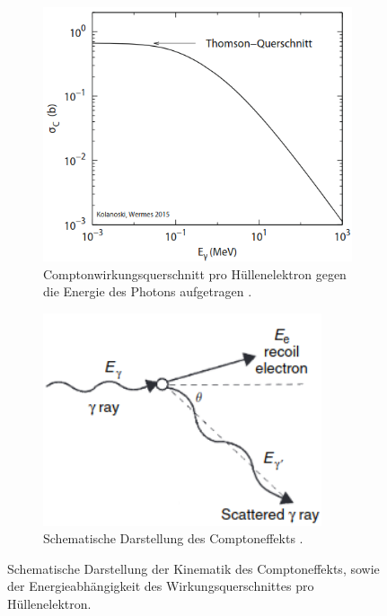 \begin{figure}
\centering
\begin{subfigure}{0.55\textwidth}
\centering
\includegraphics[width=1.03\textwidth]{compton2.png}
\captionsetup{format=hang, labelfont = bf, textfont = small}
\caption{Comptonwirkungsquerschnitt pro Hüllenelektron gegen die Energie des Photons aufgetragen \cite{quelle03}.}
\label{fig:tfig3}
\end{subfigure}
\begin{subfigure}{0.42\textwidth}
\vspace{35pt}
\centering
\includegraphics[width=0.9\textwidth]{Compton.png}
\vspace{39pt}
\captionsetup{format=hang, labelfont = bf, textfont = small}
\caption{Schematische Darstellung des Comptoneffekts \cite{quelle02}.}
\label{fig:tfig4}
\end{subfigure}
\caption{Schematische Darstellung der Kinematik des Comptoneffekts, sowie der Energieabhängigkeit des Wirkungsquerschnittes pro Hüllenelektron.}
\vspace{15pt}
\label{fig:tfig34}
\end{figure}
